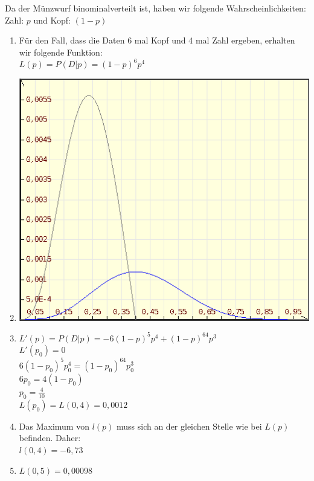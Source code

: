\documentclass{homework}
\begin{document}
\begin{enumerate}
Da der Münzwurf binominalverteilt ist, haben wir folgende Wahrscheinlichkeiten:\\
Zahl: $p$ und Kopf: $(1-p)$ 
\begin{enumerate}
\item
	Für den Fall, dass die Daten 6 mal Kopf und 4 mal Zahl ergeben, erhalten wir folgende Funktion:\\
	$L(p) = P(D|p) = (1-p)^6p^4$
\item
	\includegraphics[scale=0.3]{u3_aufg4b.png} 
\item
	$L'(p) = P(D|p) = -6(1-p)^5p^4+(1-p)^64p^3$\\
	$L'(p_0) = 0$\\
	$6(1-p_0)^5p_0^4 = (1-p_0)^64p_0^3$\\
	$6p_0 = 4(1-p_0)$\\
	$p_0 = \frac{4}{10}$\\
	$L(p_0) = L(0,4) = 0,0012$\\
\item
	Das Maximum von $l(p)$ muss sich an der gleichen Stelle wie bei $L(p)$ befinden. Daher: \\
	$l(0,4) = -6,73$
	
\item
	$L(0,5) = 0,00098$
\end{enumerate}

\end{enumerate}
\end{document}
